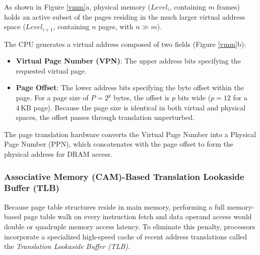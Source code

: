 As shown in Figure \ref{vmm}a, physical memory ($Level_i$, containing $m$ frames) holds an active subset of the pages residing in the much larger virtual address space ($Level_{i+1}$, containing $n$ pages, with $n \gg m$).


The CPU generates a virtual address composed of two fields (Figure \ref{vmm}b):
\begin{itemize}
    \item \textbf{Virtual Page Number (VPN)}: The upper address bits specifying the requested virtual page.
    \item \textbf{Page Offset}: The lower address bits specifying the byte offset within the page. For a page size of $P = 2^p$ bytes, the offset is $p$ bits wide ($p = 12$ for a $4\,\text{KB}$ page). Because the page size is identical in both virtual and physical spaces, the offset passes through translation unperturbed.
\end{itemize}

The page translation hardware converts the Virtual Page Number into a Physical Page Number (PPN), which concatenates with the page offset to form the physical address for DRAM access.

\subsubsection{Associative Memory (CAM)-Based Translation Lookaside Buffer (TLB)}
Because page table structures reside in main memory, performing a full memory-based page table walk on every instruction fetch and data operand access would double or quadruple memory access latency. To eliminate this penalty, processors incorporate a specialized high-speed cache of recent address translations called the \textit{Translation Lookaside Buffer (TLB)}.

